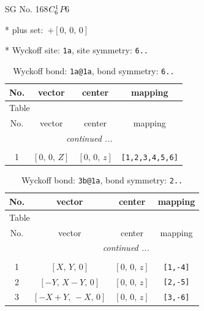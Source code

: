 \documentclass[fleqn,8pt]{jsarticle}
\begin{document}
\setcounter{MaxMatrixCols}{32}

\renewcommand{\tablename}{Table~}
\renewcommand{\figurename}{Figure~}
\begin{center}
\LARGE
SG No. 168\quad$C_{\rm 6}^{1}$\quad$P6$\quad[ hexagonal ]
\end{center}

* plus set:\,\,\,$+\left[ 0,\, 0,\, 0 \right]$


* Wyckoff site: {\tt 1a}, site symmetry: {\tt 6..}
\renewcommand{\arraystretch}{1.2}
\begin{longtable}{cccc}
\caption{Wyckoff bond: {\tt 1a@1a}, bond symmetry: {\tt 6..}}
 \\
 \hline \hline
No. & vector & center & mapping \\ \hline \endfirsthead

\multicolumn{3}{l}{\tablename\ \thetable{}} \\
 \hline \hline
No. & vector & center & mapping \\ \hline \endhead

 \hline \hline
\multicolumn{3}{r}{\footnotesize\it continued ...} \\ \endfoot

 \hline \hline
\multicolumn{3}{r}{} \\ \endlastfoot

1 & $\left[ 0,\, 0,\, Z \right]$ & $\left[ 0,\, 0,\, z \right]$ & {\tt [1,2,3,4,5,6]} \\
\end{longtable}
\renewcommand{\arraystretch}{1.2}
\begin{longtable}{cccc}
\caption{Wyckoff bond: {\tt 3b@1a}, bond symmetry: {\tt 2..}}
 \\
 \hline \hline
No. & vector & center & mapping \\ \hline \endfirsthead

\multicolumn{3}{l}{\tablename\ \thetable{}} \\
 \hline \hline
No. & vector & center & mapping \\ \hline \endhead

 \hline \hline
\multicolumn{3}{r}{\footnotesize\it continued ...} \\ \endfoot

 \hline \hline
\multicolumn{3}{r}{} \\ \endlastfoot

1 & $\left[ X,\, Y,\, 0 \right]$ & $\left[ 0,\, 0,\, z \right]$ & {\tt [1,-4]} \\ \hline
2 & $\left[ - Y,\, X - Y,\, 0 \right]$ & $\left[ 0,\, 0,\, z \right]$ & {\tt [2,-5]} \\ \hline
3 & $\left[ - X + Y,\, - X,\, 0 \right]$ & $\left[ 0,\, 0,\, z \right]$ & {\tt [3,-6]} \\
\end{longtable}
\end{document}
